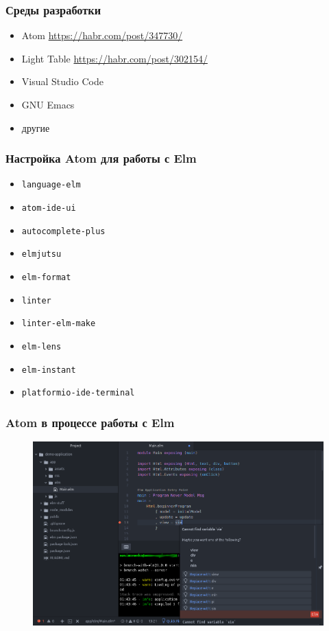 \documentclass[11pt,aspectratio=169]{beamer}
\begin{document}
\begin{frame}
\frametitle{Среды разработки}
\begin{itemize}
	\item Atom \url{https://habr.com/post/347730/}
	\item Light Table \url{https://habr.com/post/302154/}
	\item Visual Studio Code
	\item GNU Emacs
	\item другие
\end{itemize}
\end{frame}

\begin{frame}
\frametitle{Настройка Atom для работы с Elm}
\begin{itemize}
	\item \texttt{language-elm}
	\item \texttt{atom-ide-ui}
	\item \texttt{autocomplete-plus}
	\item \texttt{elmjutsu}
	\item \texttt{elm-format}
	\item \texttt{linter}
	\item \texttt{linter-elm-make}
	\item \texttt{elm-lens}
	\item \texttt{elm-instant}
	\item \texttt{platformio-ide-terminal}
\end{itemize}
\end{frame}

\begin{frame}
\frametitle{Atom в процессе работы с Elm}
\begin{figure}
	\includegraphics[scale=0.3]{elm-code-in-atom-with-error}
\end{figure}
\end{frame}
\end{document}
